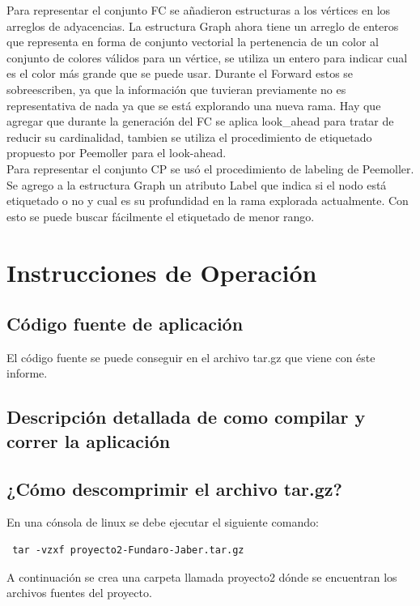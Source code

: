 \documentclass[a4paper,10pt]{article}
\begin{document}
\indent Para representar el conjunto FC se a\~nadieron estructuras a los
v\'ertices en los arreglos de adyacencias. La estructura Graph ahora
tiene un arreglo de enteros que representa en forma de conjunto
vectorial la pertenencia de un color al conjunto de colores v\'alidos
para un v\'ertice, se utiliza un entero para indicar cual es el color
m\'as grande que se puede usar. Durante el Forward estos se sobreescriben, ya que la
informaci\'on que tuvieran previamente no es representativa de nada ya
que se est\'a explorando una nueva rama. Hay que agregar que durante la
generaci\'on del FC se aplica look_ahead para tratar de reducir su
cardinalidad, tambien se utiliza el procedimiento de etiquetado
propuesto por Peemoller para el look-ahead.\\

\indent Para representar el conjunto CP se us\'o el procedimiento de labeling de
Peemoller. Se agrego a la estructura Graph un atributo Label que indica
si el nodo est\'a etiquetado o no y cual es su profundidad en la rama
explorada actualmente. Con esto se puede buscar f\'acilmente el
etiquetado de menor rango.
\newpage

\section{Instrucciones de Operación}

\subsection{Código fuente de aplicación}
El código fuente se puede conseguir en el archivo tar.gz que viene con
éste informe.

\subsection{Descripción detallada de como compilar y correr la aplicación}

\subsection{¿Cómo descomprimir el archivo tar.gz?}
En una cónsola de linux se debe ejecutar el siguiente comando:
\begin{verbatim}
 tar -vzxf proyecto2-Fundaro-Jaber.tar.gz
\end{verbatim}
A continuación se crea una carpeta llamada proyecto2 dónde se encuentran
los archivos fuentes del proyecto.
\end{document}
